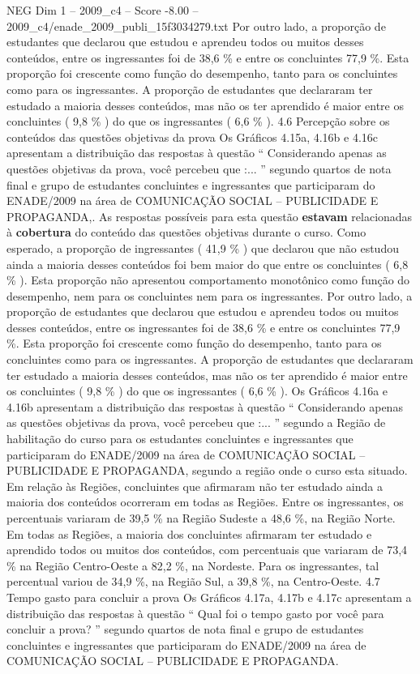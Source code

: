 \begin{textsample}{NEG Dim 1 – 2009\_c4 – Score -8.00 – 2009\_c4/enade\_2009\_publi\_15f3034279.txt}
Por outro lado, a proporção de estudantes que declarou que estudou e aprendeu todos ou muitos desses conteúdos, entre os ingressantes foi de 38,6 \% e entre os concluintes 77,9 \%.
Esta proporção foi crescente como função do desempenho, tanto para os concluintes como para os ingressantes.
A proporção de estudantes que declararam ter estudado a maioria desses conteúdos, mas não os ter aprendido é maior entre os concluintes ( 9,8 \% ) do que os ingressantes ( 6,6 \% ). 4.6 Percepção sobre os conteúdos das questões objetivas da prova Os Gráficos 4.15a, 4.16b e 4.16c apresentam a distribuição das respostas à questão “ Considerando apenas as questões objetivas da prova, você percebeu que :... ” segundo quartos de nota final e grupo de estudantes concluintes e ingressantes que participaram do ENADE/2009 na área de COMUNICAÇÃO SOCIAL – PUBLICIDADE E PROPAGANDA,.
As respostas possíveis para esta questão \textbf{estavam} relacionadas à \textbf{cobertura} do conteúdo das questões objetivas durante o curso.
Como esperado, a proporção de ingressantes ( 41,9 \% ) que declarou que não estudou ainda a maioria desses conteúdos foi bem maior do que entre os concluintes ( 6,8 \% ).
Esta proporção não apresentou comportamento monotônico como função do desempenho, nem para os concluintes nem para os ingressantes.
Por outro lado, a proporção de estudantes que declarou que estudou e aprendeu todos ou muitos desses conteúdos, entre os ingressantes foi de 38,6 \% e entre os concluintes 77,9 \%.
Esta proporção foi crescente como função do desempenho, tanto para os concluintes como para os ingressantes.
A proporção de estudantes que declararam ter estudado a maioria desses conteúdos, mas não os ter aprendido é maior entre os concluintes ( 9,8 \% ) do que os ingressantes ( 6,6 \% ).
Os Gráficos 4.16a e 4.16b apresentam a distribuição das respostas à questão “ Considerando apenas as questões objetivas da prova, você percebeu que :... ” segundo a Região de habilitação do curso para os estudantes concluintes e ingressantes que participaram do ENADE/2009 na área de COMUNICAÇÃO SOCIAL – PUBLICIDADE E PROPAGANDA, segundo a região onde o curso esta situado.
Em relação às Regiões, concluintes que afirmaram não ter estudado ainda a maioria dos conteúdos ocorreram em todas as Regiões.
Entre os ingressantes, os percentuais variaram de 39,5 \% na Região Sudeste a 48,6 \%, na Região Norte.
Em todas as Regiões, a maioria dos concluintes afirmaram ter estudado e aprendido todos ou muitos dos conteúdos, com percentuais que variaram de 73,4 \% na Região Centro-Oeste a 82,2 \%, na Nordeste.
Para os ingressantes, tal percentual variou de 34,9 \%, na Região Sul, a 39,8 \%, na Centro-Oeste. 4.7 Tempo gasto para concluir a prova Os Gráficos 4.17a, 4.17b e 4.17c apresentam a distribuição das respostas à questão “ Qual foi o tempo gasto por você para concluir a prova? ” segundo quartos de nota final e grupo de estudantes concluintes e ingressantes que participaram do ENADE/2009 na área de COMUNICAÇÃO SOCIAL – PUBLICIDADE E PROPAGANDA.

\end{textsample}
